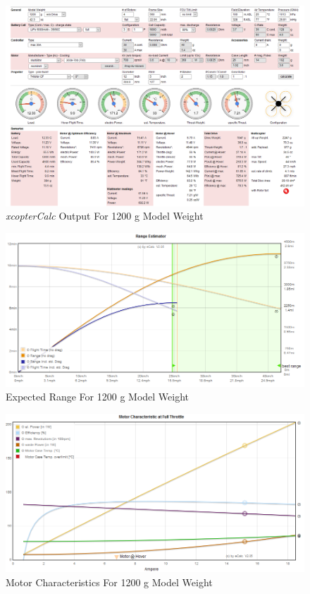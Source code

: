 \begin{figure}[H]
\centering
\includegraphics[width=16.5cm]{img/1200g_sim.png}
\caption{\textit{xcopterCalc} Output For 1200 g Model Weight}
\end{figure} 

\begin{figure}[H]
\centering
\includegraphics[width=16.5cm]{img/1200g_range.png}
\caption{Expected Range For 1200 g Model Weight}
\end{figure} 

\begin{figure}[H]
\centering
\includegraphics[width=16.5cm]{img/1200g_motor.png}
\caption{Motor Characteristics For 1200 g Model Weight}
\end{figure} 

